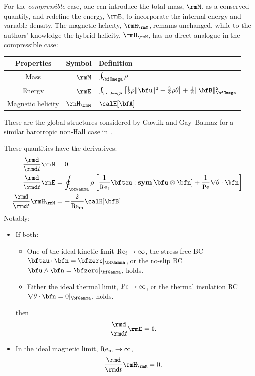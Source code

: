     For the \emph{compressible} case, one can introduce the total mass, $\rmM$, as a conserved quantity, and redefine the energy, $\rmE$, to incorporate the internal energy and variable density. The magnetic helicity, $\rmH_{\rmM}$, remains unchanged, while to the authors' knowledge the hybrid helicity, $\rmH_{\rmH}$, has no direct analogue in the compressible case:
    \begin{center}\begin{tabular}{ c | r : l }
        Properties  &  Symbol  &  Definition  \\
        \hline\hline
        Mass  &  $\rmM$  &  $\int_{\bfOmega}\rho$  \\
        Energy  &  $\rmE$  &  $\int_{\bfOmega}\left[\frac{1}{2}\rho\|\bfu\|^{2} + \frac{3}{2}\rho\theta\right] + \frac{1}{\beta}\|\bfB\|_{\bfOmega}^{2}$  \\
        \hdashline
        Magnetic helicity \cite{Blackman_2015}  &  $\rmH_{\rmM}$  &  $\calH[\bfA]$
    \end{tabular}\end{center}
    These are the global structures considered by Gawlik and Gay--Balmaz for a similar barotropic non-Hall case in \cite{Gawlik_Gay--Balmaz_2021}.

    These quantities have the derivatives:
    \begin{align}
        \frac{\rmd}{\rmd t}\rmM         &=  0  \\
        \frac{\rmd}{\rmd t}\rmE         &=  \oint_{\bfGamma}\rho\left[\frac{1}{\rmRef}\bftau:\sym[\bfu\otimes\bfn] + \frac{1}{\rmPe}\nabla\theta\cdot\bfn\right]  \\
        \frac{\rmd}{\rmd t}\rmH_{\rmM}  &=  - \frac{2}{\rmRem}\calH[\bfB]
    \end{align}
    Notably:
    \begin{itemize}
        \item  If both:
        \begin{itemize}
            \item  One of the ideal kinetic limit $\mathrm{Re}_{\mathrm{f}}  \rightarrow  \infty$, the stress-free BC $\bftau\cdot\bfn  =  \bfzero|_{\bfGamma}$, or the no-slip BC $\bfu\wedge\bfn  =  \bfzero|_{\bfGamma}$, holds.
            \item  Either the ideal thermal limit, $\mathrm{Pe}  \rightarrow  \infty$, or the thermal insulation BC $\nabla\theta\cdot\bfn  =  0|_{\bfGamma}$, holds.
        \end{itemize}
        then
        \begin{equation}
            \frac{\rmd}{\rmd t}\rmE  =  0.
        \end{equation}

        \item  In the ideal magnetic limit, $\mathrm{Re}_{\mathrm{m}}  \rightarrow  \infty$,
        \begin{equation}
            \frac{\rmd}{\rmd t}\rmH_{\rmM}  =  0.
        \end{equation}
      \end{itemize}

